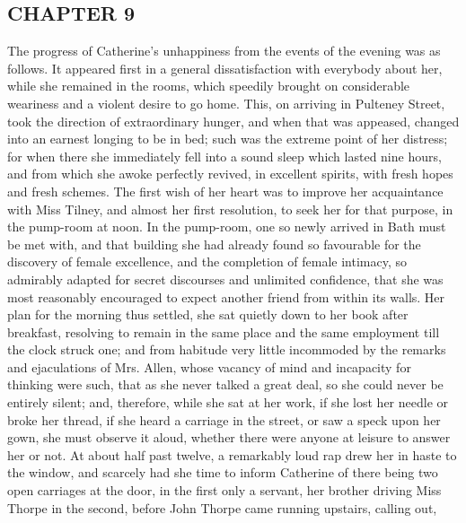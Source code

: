\subsection[chapter-9]{\useURL[url11][][][]\from[url11]CHAPTER 9}

The progress of Catherine's unhappiness from the events of the evening was as follows. It appeared first in a general dissatisfaction with everybody about her, while she remained in the rooms, which speedily brought on considerable weariness and a violent desire to go home. This, on arriving in Pulteney Street, took the direction of extraordinary hunger, and when that was appeased, changed into an earnest longing to be in bed; such was the extreme point of her distress; for when there she immediately fell into a sound sleep which lasted nine hours, and from which she awoke perfectly revived, in excellent spirits, with fresh hopes and fresh schemes. The first wish of her heart was to improve her acquaintance with Miss Tilney, and almost her first resolution, to seek her for that purpose, in the pump-room at noon. In the pump-room, one so newly arrived in Bath must be met with, and that building she had already found so favourable for the discovery of female excellence, and the completion of female intimacy, so admirably adapted for secret discourses and unlimited confidence, that she was most reasonably encouraged to expect another friend from within its walls. Her plan for the morning thus settled, she sat quietly down to her book after breakfast, resolving to remain in the same place and the same employment till the clock struck one; and from habitude very little incommoded by the remarks and ejaculations of Mrs. Allen, whose vacancy of mind and incapacity for thinking were such, that as she never talked a great deal, so she could never be entirely silent; and, therefore, while she sat at her work, if she lost her needle or broke her thread, if she heard a carriage in the street, or saw a speck upon her gown, she must observe it aloud, whether there were anyone at leisure to answer her or not. At about half past twelve, a remarkably loud rap drew her in haste to the window, and scarcely had she time to inform Catherine of there being two open carriages at the door, in the first only a servant, her brother driving Miss Thorpe in the second, before John Thorpe came running upstairs, calling out, 

